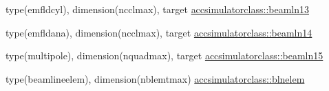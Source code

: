 \begin{DoxyCompactItemize}
\item 
type(emfldcyl), dimension(ncclmax), target \mbox{\hyperlink{namespaceaccsimulatorclass_a92ae9c79c3447b1e1d8b78eb631ab3bd}{accsimulatorclass\+::beamln13}}
\item 
type(emfldana), dimension(ncclmax), target \mbox{\hyperlink{namespaceaccsimulatorclass_a5633142ff697d3bca2adc68d9a78aedf}{accsimulatorclass\+::beamln14}}
\item 
type(multipole), dimension(nquadmax), target \mbox{\hyperlink{namespaceaccsimulatorclass_aa020b23d82bc9d6cf8dfa7bc24b3e691}{accsimulatorclass\+::beamln15}}
\item 
type(beamlineelem), dimension(nblemtmax) \mbox{\hyperlink{namespaceaccsimulatorclass_ab6961a98774a4f5d3d6b78342ed63e56}{accsimulatorclass\+::blnelem}}
\end{DoxyCompactItemize}

